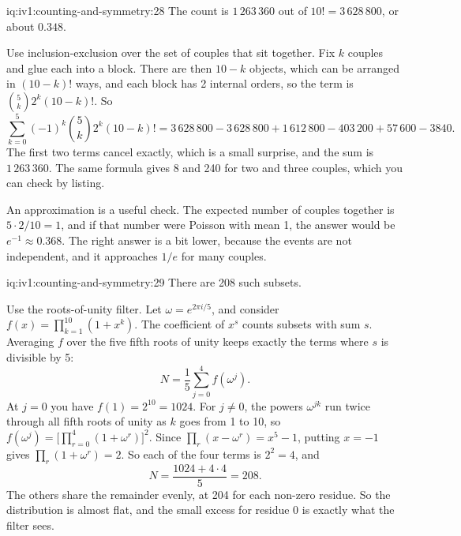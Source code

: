 \begin{solution}{iq:iv1:counting-and-symmetry:28}
The count is $1\,263\,360$ out of $10! = 3\,628\,800$, or about $0.348$.

Use inclusion-exclusion over the set of couples that sit together. Fix $k$ couples and glue each into a block. There are then $10 - k$ objects, which can be arranged in $(10 - k)!$ ways, and each block has 2 internal orders, so the term is $\binom{5}{k} 2^k (10 - k)!$. So
\[
\sum_{k=0}^{5} (-1)^k \binom{5}{k} 2^k (10 - k)! = 3\,628\,800 - 3\,628\,800 + 1\,612\,800 - 403\,200 + 57\,600 - 3840.
\]
The first two terms cancel exactly, which is a small surprise, and the sum is $1\,263\,360$. The same formula gives 8 and 240 for two and three couples, which you can check by listing.

An approximation is a useful check. The expected number of couples together is $5 \cdot 2/10 = 1$, and if that number were Poisson with mean 1, the answer would be $e^{-1} \approx 0.368$. The right answer is a bit lower, because the events are not independent, and it approaches $1/e$ for many couples.

\end{solution}

\begin{solution}{iq:iv1:counting-and-symmetry:29}
There are 208 such subsets.

Use the roots-of-unity filter. Let $\omega = e^{2\pi i/5}$, and consider $f(x) = \prod_{k=1}^{10}(1 + x^k)$. The coefficient of $x^s$ counts subsets with sum $s$. Averaging $f$ over the five fifth roots of unity keeps exactly the terms where $s$ is divisible by 5:
\[
N = \frac15 \sum_{j=0}^{4} f(\omega^j).
\]
At $j = 0$ you have $f(1) = 2^{10} = 1024$. For $j \ne 0$, the powers $\omega^{jk}$ run twice through all fifth roots of unity as $k$ goes from 1 to 10, so $f(\omega^j) = \bigl[\prod_{r=0}^{4}(1 + \omega^r)\bigr]^2$. Since $\prod_r (x - \omega^r) = x^5 - 1$, putting $x = -1$ gives $\prod_r (1 + \omega^r) = 2$. So each of the four terms is $2^2 = 4$, and
\[
N = \frac{1024 + 4 \cdot 4}{5} = 208.
\]
The others share the remainder evenly, at 204 for each non-zero residue. So the distribution is almost flat, and the small excess for residue 0 is exactly what the filter sees.

\end{solution}

